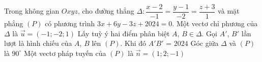 \begin{ex} %
	Trong không gian $Oxyz$, cho đường thẳng $\Delta \colon \dfrac{x-2}{-1}=\dfrac{y-1}{-2}=\dfrac{z+3}{1}$ và mặt phẳng $(P)$ có phương trình $3x+6y-3z+2024=0$.
	\choiceTF
	{\True Một vectơ chỉ phương của $\Delta$ là $\overrightarrow{u}=(-1;-2;1)$}
	{Lấy tuỳ ý hai điểm phân biệt $A$, $B\in \Delta$. Gọi $A'$, $B'$ lần lượt là hình chiếu của $A$, $B$ lên $(P)$. Khi đó $A'B'$ = $2024$}
	{\True Góc giữa $\Delta$ và $(P)$ là $90^\circ$}
	{Một vectơ pháp tuyến của $(P)$ là $\overrightarrow{n}=(1;2;-1)$}
\end{ex}

